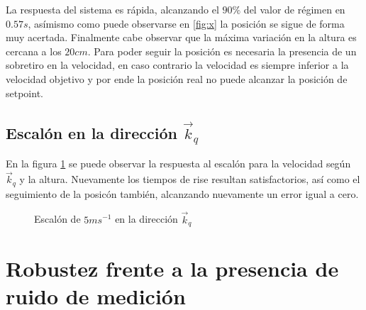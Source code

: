 \documentclass[main]{subfiles}
\begin{document}
La respuesta del sistema es r\'apida, alcanzando el $90\%$ del valor de r\'egimen en $0.57s$, as\'imismo como puede observarse en \ref{fig:x} la posici\'on se sigue de forma muy acertada. Finalmente cabe observar que la m\'axima variaci\'on en la altura es cercana a los $20cm$. Para poder seguir la posici\'on es necesaria la presencia de un sobretiro en la velocidad, en caso contrario la velocidad es siempre inferior a la velocidad objetivo y por ende la posici\'on real no puede alcanzar la posici\'on de setpoint.
\subsection*{Escal\'on en la direcci\'on $\vec{k}_q$}
En la figura \ref{fig:rec_esc_z} se puede observar la respuesta al escal\'on para la velocidad seg\'un $\vec{k}_q$ y la altura. Nuevamente los tiempos de rise resultan satisfactorios, as\'i como el seguimiento de la posic\'on tambi\'en, alcanzando nuevamente un error igual a cero. 

\begin{figure}
  \centering

  \caption{Escal\'on de $5m s^{-1}$ en la direcci\'on $\vec{k}_q$}
  \label{fig:rec_esc_z}
\end{figure}
\section{Robustez frente a la presencia de ruido de medici\'on}
\end{document}
